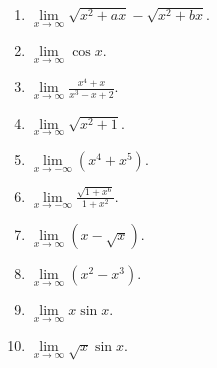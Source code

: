\begin{multicols}{3}
\begin{enumerate}[ref={\fcProblemRef}]
\item $\displaystyle \lim\limits_{x\to \infty}\sqrt{ x^2+ax}- \sqrt{x^2+bx}$.

\item $\displaystyle \lim\limits_{x\to\infty}\cos x$.

\item $\displaystyle \lim\limits_{x\to\infty}\frac{x^4+x}{x^3-x+2}$.

\answer{$\infty$}
\item $\displaystyle \lim\limits_{x\to\infty}\sqrt{x^2+1}$.

\answer{$\infty$}
\item $\displaystyle \lim\limits_{x\to-\infty}(x^4+x^5)$.

\answer{$-\infty$}
\item $\displaystyle \lim\limits_{x\to-\infty}\frac{\sqrt{1+x^6}}{1+x^2}$.

\answer{$\infty$}
\item $\displaystyle \lim\limits_{x\to\infty}(x-\sqrt{x})$.

\answer{$\infty$}
\item $\displaystyle \lim\limits_{x\to\infty}(x^2-x^3)$.

\answer{$-\infty$}
\item $\displaystyle \lim\limits_{x\to\infty}x\sin x$.

\item $\displaystyle \lim\limits_{x\to\infty}\sqrt{x}\sin x$.

\end{enumerate}
\end{multicols}